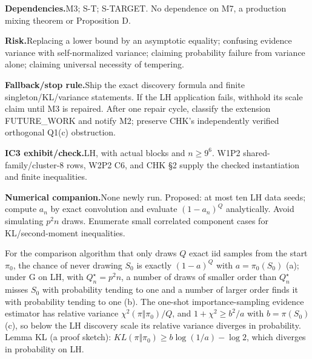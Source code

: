 {\par\smallskip\noindent\textbf{Dependencies.}\enspace M3; S-T; S-TARGET. No dependence on M7, a production mixing theorem or Proposition D.
\par\smallskip\noindent\textbf{Risk.}\enspace Replacing a lower bound by an asymptotic equality; confusing evidence variance with self-normalized variance; claiming probability failure from variance alone; claiming universal necessity of tempering.
\par\smallskip\noindent\textbf{Fallback/stop rule.}\enspace Ship the exact discovery formula and finite singleton/KL/variance statements. If the LH application fails, withhold its scale claim until M3 is repaired. After one repair cycle, classify the extension FUTURE\_WORK and notify M2; preserve CHK’s independently verified orthogonal Q1(c) obstruction.
\par\smallskip\noindent\textbf{IC3 exhibit/check.}\enspace LH, with actual blocks and \(n\ge9^6\). W1P2 shared-family/cluster-8 rows, W2P2 C6, and CHK §2 supply the checked instantiation and finite inequalities.
\par\smallskip\noindent\textbf{Numerical companion.}\enspace None newly run. Proposed: at most ten LH data seeds; compute \(a_n\) by exact convolution and evaluate \((1-a_n)^Q\) analytically. Avoid simulating \(p^2n\) draws. Enumerate small correlated component cases for KL/second-moment inequalities.
}

\begin{plain}
For the comparison algorithm that only draws $Q$ exact iid samples from the start $\pi_0$, the chance of never drawing $S_0$ is exactly $(1-a)^Q$ with $a=\pi_0(S_0)$ (a); under G on LH, with $Q^{\star}_n=p^2n$, a number of draws of smaller order than $Q^{\star}_n$ misses $S_0$ with probability tending to one and a number of larger order finds it with probability tending to one (b). The one-shot importance-sampling evidence estimator has relative variance $\chi^2(\pi\Vert\pi_0)/Q$, and $1+\chi^2\ge b^2/a$ with $b=\pi(S_0)$ (c), so below the LH discovery scale its relative variance diverges in probability. Lemma KL (a proof sketch): $KL(\pi\Vert\pi_0)\ge b\log(1/a)-\log2$, which diverges in probability on LH.
\end{plain}

